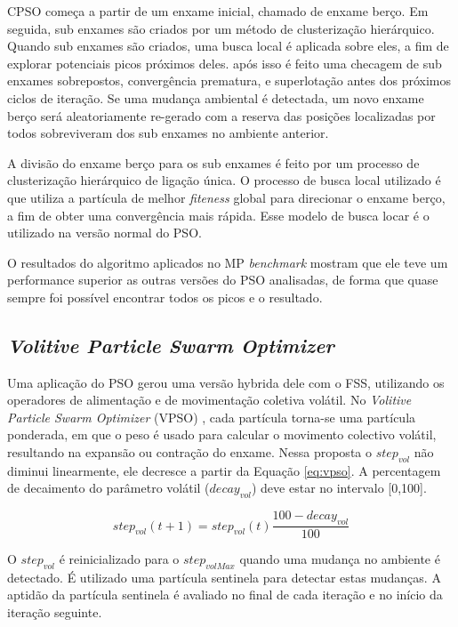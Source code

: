CPSO começa a partir de um enxame inicial, chamado de enxame berço. Em seguida, sub enxames são criados por um método de clusterização hierárquico. Quando sub enxames são criados, uma busca local é aplicada sobre eles, a fim de explorar potenciais picos próximos deles. após isso é feito uma checagem de sub enxames sobrepostos, convergência prematura, e superlotação antes dos próximos ciclos de iteração. Se uma mudança ambiental é detectada, um novo enxame berço será aleatoriamente re-gerado com a reserva das posições localizadas por todos sobreviveram dos sub enxames no ambiente anterior.

A divisão do enxame berço para os sub enxames é feito por um processo de clusterização hierárquico de ligação única. O processo de busca local utilizado é que utiliza a partícula de melhor \textit{fiteness} global para direcionar o enxame berço, a fim de obter uma convergência mais rápida. Esse modelo de busca locar é o utilizado na versão normal do PSO. 

O resultados do algoritmo aplicados no MP \textit{benchmark} mostram que ele teve um performance superior as outras versões do PSO analisadas, de forma que quase sempre foi possível encontrar todos os picos e o resultado.

\subsection{\textit{Volitive Particle Swarm Optimizer}}
\label{sec:vpso}

Uma aplicação do PSO gerou uma versão hybrida dele com o FSS, utilizando os operadores de alimentação e de movimentação coletiva volátil. No \textit{Volitive Particle Swarm Optimizer} (VPSO) \cite{cavalcanti2011hybrid}, cada partícula torna-se uma partícula ponderada, em que o peso é usado para calcular o movimento colectivo volátil, resultando na expansão ou contração do enxame. Nessa proposta o $step_{vol}$ não diminui linearmente, ele decresce a partir da Equação \ref{eq:vpso}. A percentagem de decaimento do parâmetro volátil ($decay_{vol}$) deve estar no intervalo [0,100].

\begin{equation}
\label{eq:vpso}
step_{vol}(t+1) = step_{vol}(t) \frac{100 - decay_{vol}}{100}
\end{equation}

\noindent O $step_{vol}$ é reinicializado para o $step_{volMax}$ quando uma mudança no ambiente é detectado. É utilizado uma partícula sentinela para detectar estas mudanças. A aptidão da partícula sentinela é avaliado no final de cada iteração e no início da iteração seguinte.

